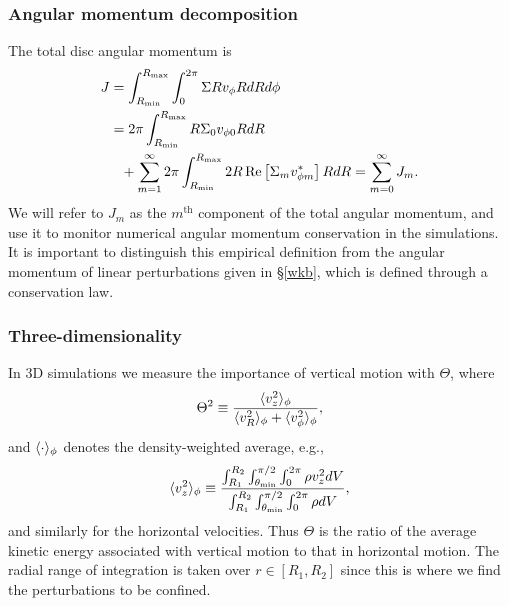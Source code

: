 \subsubsection{Angular momentum decomposition}
The total disc angular momentum is
\begin{align}
  J &= \int_{R_\mathrm{min}}^{R_\mathrm{max}}\int_0^{2\pi} \Sigma Rv_\phi RdRd\phi \notag\\
  &= 2\pi\int_{R_\mathrm{min}}^{R_\mathrm{max}} R\Sigma_0 v_{\phi0} R dR \notag\\ 
  &\phantom{=}+
  \sum_{m=1}^\infty2\pi\int_{R_\mathrm{min}}^{R_\mathrm{max}} 2R\operatorname{Re}\left[\Sigma_m v_{\phi
      m}^*\right] RdR 
  = \sum_{m=0}^\infty J_m. 
\end{align}
We will refer to $J_m$ as the
$m^\mathrm{th}$ component of the total angular momentum, and use it to
monitor numerical angular momentum conservation in the simulations. 
It is important to distinguish this empirical definition from the
angular momentum of linear perturbations given in \S\ref{wkb}, which
is defined through a conservation law. 


\subsubsection{Three-dimensionality}
In 3D simulations we measure the importance of vertical motion with
$\Theta$, where 
\begin{align}\label{theta}
  \Theta^2 \equiv \frac{\langle v_z^2 \rangle_\phi}{\langle v_R^2 \rangle_\phi+\langle v_\phi^2 \rangle_\phi}, 
\end{align}
and $\langle \cdot \rangle_\phi$ denotes the density-weighted average, e.g., 
\begin{align}
  \langle v_z^2 \rangle_\phi \equiv\frac{
    \int_{R_1}^{R_2}\int_{\theta_\mathrm{min}}^{\pi/2} \int_{0}^{2\pi}
    \rho v_z^2 dV}{
    \int_{R_1}^{R_2}\int_{\theta_\mathrm{min}}^{\pi/2} \int_{0}^{2\pi}
    \rho dV
  },
\end{align}
and similarly for the horizontal velocities. Thus $\Theta$ is the
ratio of the average kinetic energy associated with vertical motion to
that in horizontal motion. The radial range of
integration is taken over $r\in[R_1,R_2]$ since this is where
we find the perturbations to be confined. 






